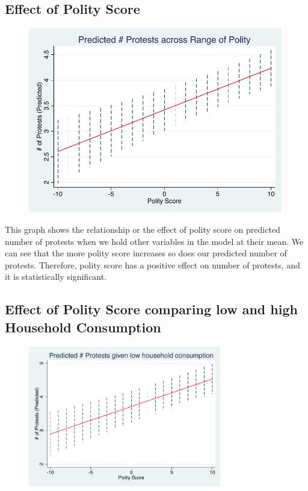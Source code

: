 \documentclass[12pt]{article}
\begin{document}
\subsection{Effect of Polity Score}
\begin{figure}[H]
  \centering
  \includegraphics[width=0.99\textwidth]{polity1.pdf}
  \end{figure}
  
This graph shows the relationship or the effect of polity score on predicted number of protests when we hold other variables in the model at their mean. We can see that the more polity score increases so does our predicted number of protests. Therefore, polity score has a positive effect on number of protests, and it is statistically significant.  


\subsection{Effect of Polity Score comparing low and high Household Consumption}
\begin{figure}[H]
  \centering
  \includegraphics[width=0.75\textwidth]{polity10.pdf}
  \end{figure}
\end{document}
